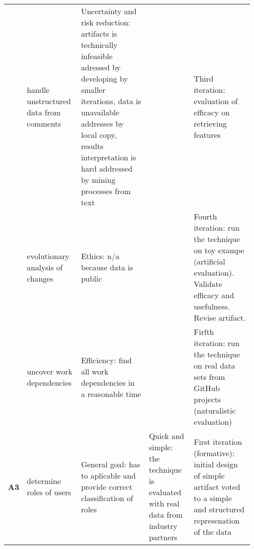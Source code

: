 \begin{longtable}[c]{@{}p{1.2cm}p{2.5cm}p{5cm}p{3cm}p{4cm}@{}}
                  & handle unstructured data from comments         & Uncertainty and risk reduction: artifacts is technically infeasible adressed by developing by smaller iterations, data is unavailable addresses by local copy, results interpretation is hard addressed by mining processes from text                                    &                                                                                                                                                      & Third iteration: evaluation of efficacy on retrieving features                                                                \\
                  & evolutionary analysis of changes               & Ethics: n/a because data is public                                                                                                                                                                                                                                       &                                                                                                                                                      & Fourth iteration: run the technique on toy exampe (artificial evaluation). Validate efficacy and usefulness. Revise artifact. \\
                  & uncover work dependencies                      & Efficiency: find all work dependencies in a reasonable time                                                                                                                                                                                                              &                                                                                                                                                      & Firfth iteration: run the technique on real data sets from GitHub projects (naturalistic evaluation)                          \\* \midrule
\textbf{A3}       & determine roles of users                       & General goal: has to aplicable and provide correct classification of roles                                                                                                                                                                                               & Quick and simple: the technique is evaluated with real data from industry partners                                                                   & First iteration (formative): initial design of simple artifact voted to a simple and structured represenation of the data     \\

\end{longtable}
